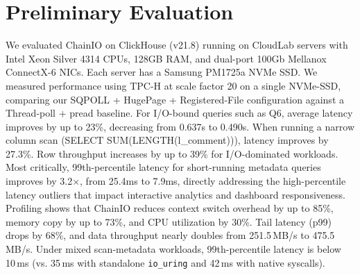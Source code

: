 \documentclass[sigconf,10pt]{acmart}
\newcommand{\sys}{ChainIO\xspace}
\begin{document}
\section{Preliminary Evaluation}\label{sec:evaluation}

We evaluated \sys on ClickHouse (v21.8) running on CloudLab servers with Intel Xeon Silver 4314 CPUs, 128GB RAM, and dual-port 100Gb Mellanox ConnectX-6 NICs. Each server has a Samsung PM1725a NVMe SSD. We measured performance using TPC-H at scale factor 20 on a single NVMe-SSD, comparing our SQPOLL + HugePage + Registered-File configuration against a Thread-poll + pread baseline. For I/O-bound queries such as Q6, average latency improves by up to 23\%, decreasing from 0.637s to 0.490s. When running a narrow column scan (SELECT SUM(LENGTH(l\_comment))), latency improves by 27.3\%. Row throughput increases by up to 39\% for I/O-dominated workloads. Most critically, 99th-percentile latency for short-running metadata queries improves by 3.2×, from 25.4ms to 7.9ms, directly addressing the high-percentile latency outliers that impact interactive analytics and dashboard responsiveness. Profiling shows that \sys reduces context switch overhead by up to 85\%, memory copy by up to 73\%, and CPU utilization by 30\%. Tail latency (p99) drops by 68\%, and data throughput nearly doubles from 251.5\,MB/s to 475.5\,MB/s. Under mixed scan-metadata workloads, 99th-percentile latency is below 10\,ms (vs. 35\,ms with standalone \texttt{io\_uring} and 42\,ms with native syscalls).



\end{document}
